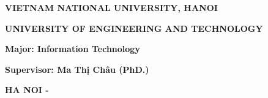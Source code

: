 \begin{center}\adddecorativeborder
    \thispagestyle{plain}
    
    {\large\textbf{VIETNAM NATIONAL UNIVERSITY, HANOI}\par}
    {\large\textbf{UNIVERSITY OF ENGINEERING AND TECHNOLOGY}\par}
    \vspace{1cm}

    {\Large\bfseries \AuthorName \par}

    \vspace{2cm}

    {\LARGE\bfseries \ProjectNameEng \par}
     
    \vspace{2cm}

    {\Large\bfseries Major: Information Technology\par}
    
    \vspace{3cm}

    \begin{flushleft}
    {\Large\bfseries Supervisor: Ma Thị Châu (PhD.)\par}
    \end{flushleft}
    
    \vspace{1.5cm}
    

    \vfill
    
    {\large\bfseries HA NOI - \the\year{} \par}
\end{center}
